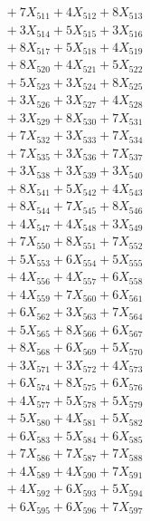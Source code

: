 \documentclass[a4paper,10pt]{article}
\begin{document}
{\begin{align}
&\;  + 7 X_{511} + 4 X_{512} + 8 X_{513} \\[0.3ex]
&\;  + 3 X_{514} + 5 X_{515} + 3 X_{516} \\[0.3ex]
&\;  + 8 X_{517} + 5 X_{518} + 4 X_{519} \\[0.5ex]\allowbreak
&\;  + 8 X_{520} + 4 X_{521} + 5 X_{522} \\[0.3ex]
&\;  + 5 X_{523} + 3 X_{524} + 8 X_{525} \\[0.3ex]
&\;  + 3 X_{526} + 3 X_{527} + 4 X_{528} \\[0.3ex]
&\;  + 3 X_{529} + 8 X_{530} + 7 X_{531} \\[0.3ex]
&\;  + 7 X_{532} + 3 X_{533} + 7 X_{534} \\[0.3ex]
&\;  + 7 X_{535} + 3 X_{536} + 7 X_{537} \\[0.3ex]
&\;  + 3 X_{538} + 3 X_{539} + 3 X_{540} \\[0.3ex]
&\;  + 8 X_{541} + 5 X_{542} + 4 X_{543} \\[0.3ex]
&\;  + 8 X_{544} + 7 X_{545} + 8 X_{546} \\[0.3ex]
&\;  + 4 X_{547} + 4 X_{548} + 3 X_{549} \\[0.5ex]\allowbreak
&\;  + 7 X_{550} + 8 X_{551} + 7 X_{552} \\[0.3ex]
&\;  + 5 X_{553} + 6 X_{554} + 5 X_{555} \\[0.3ex]
&\;  + 4 X_{556} + 4 X_{557} + 6 X_{558} \\[0.3ex]
&\;  + 4 X_{559} + 7 X_{560} + 6 X_{561} \\[0.3ex]
&\;  + 6 X_{562} + 3 X_{563} + 7 X_{564} \\[0.3ex]
&\;  + 5 X_{565} + 8 X_{566} + 6 X_{567} \\[0.3ex]
&\;  + 8 X_{568} + 6 X_{569} + 5 X_{570} \\[0.3ex]
&\;  + 3 X_{571} + 3 X_{572} + 4 X_{573} \\[0.3ex]
&\;  + 6 X_{574} + 8 X_{575} + 6 X_{576} \\[0.3ex]
&\;  + 4 X_{577} + 5 X_{578} + 5 X_{579} \\[0.5ex]\allowbreak
&\;  + 5 X_{580} + 4 X_{581} + 5 X_{582} \\[0.3ex]
&\;  + 6 X_{583} + 5 X_{584} + 6 X_{585} \\[0.3ex]
&\;  + 7 X_{586} + 7 X_{587} + 7 X_{588} \\[0.3ex]
&\;  + 4 X_{589} + 4 X_{590} + 7 X_{591} \\[0.3ex]
&\;  + 4 X_{592} + 6 X_{593} + 5 X_{594} \\[0.3ex]
&\;  + 6 X_{595} + 6 X_{596} + 7 X_{597} \\[0.3ex]

\end{align}}
\end{document}
